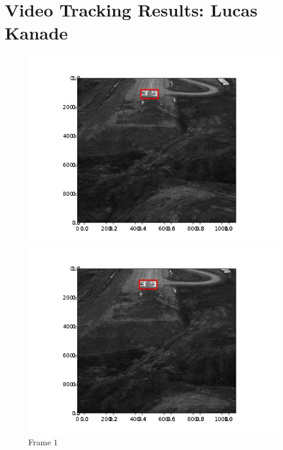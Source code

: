 \section{Video Tracking Results: Lucas Kanade}


\begin{figure}[H]
  \centering
  \begin{minipage}{.49\textwidth}
    \centering
    \includegraphics[width=\textwidth]{./figures/lk/landing/frame000001.jpg}
    \caption{Frame $1$}
  \end{minipage}
  \hfill
  \begin{minipage}{.49\textwidth}
    \centering
    \includegraphics[width=\textwidth]{./figures/lk/landing/frame000010.jpg}

\end{minipage}
\end{figure}
